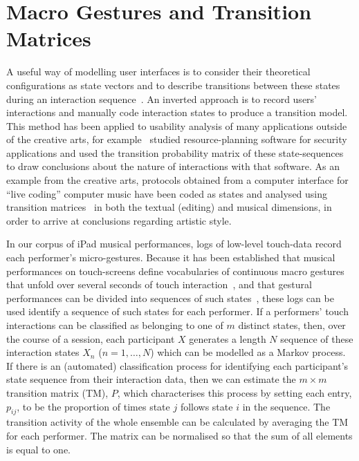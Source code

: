 \documentclass{sigchi}
\begin{document}
\break 
\section{Macro Gestures and Transition Matrices}

A useful way of modelling user interfaces is to consider their
theoretical configurations as state vectors and to describe transitions between these states during
an interaction sequence~\cite{Thimbleby:2001kq, Thimbleby:2004fj}. An
inverted approach is to record users' interactions and manually code
interaction states to produce a transition model. This method has been
applied to usability analysis of many applications outside of the creative arts, for example~\cite{Kannampallil:2007fp}
studied resource-planning software for
security applications and used the transition
probability matrix of these state-sequences to draw
conclusions about the nature of interactions with that software. As an example from the creative
arts, protocols obtained from a computer interface for ``live coding''
computer music have been  coded as states and analysed using
transition matrices~\cite{Swift:2014tya} in both the textual (editing) and
musical dimensions, in order to arrive at conclusions regarding
artistic style.

In our corpus of iPad musical performances, logs of low-level touch-data record each performer's micro-gestures. 
Because it has been
established that musical performances on touch-screens define  
vocabularies of continuous macro gestures that unfold over
several seconds of touch interaction~\cite{Martin:2014cr}, and that
gestural performances can be divided into sequences of such states~\cite{Pressing:1988uo}, these logs
 can be used identify a sequence of such states for each performer.
If a performers' touch interactions can be classified as belonging
to one of $m$ distinct states, then, over the course of a session, each
participant $X$ generates a length $N$ sequence of these interaction
states $X_n$ ($n = 1, \ldots, N$) which can be modelled as a Markov
process.
If there is an (automated) classification process for identifying each
participant's state sequence from their interaction data, then we can
estimate the $m \times m$ transition matrix (TM), $P$, which characterises
this process by setting each entry, $p_{ij}$, to be the proportion of times
state $j$ follows state $i$ in the sequence. The transition activity
of the whole ensemble can be calculated by averaging the TM for each
performer. The matrix can be normalised so that the sum of all
elements is equal to one.
\end{document}
